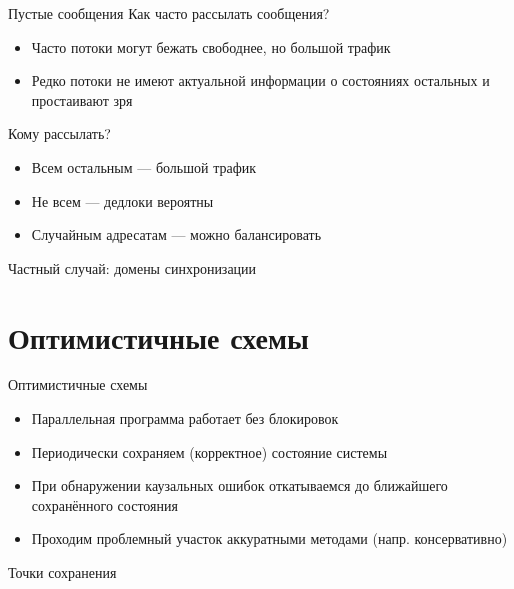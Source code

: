 \documentclass{beamer}
\begin{document}
\begin{frame}{Пустые сообщения}
Как часто рассылать сообщения?

\begin{itemize}
\item Часто \textrightarrow{} потоки могут бежать свободнее, но большой трафик
\item Редко \textrightarrow{} потоки не имеют актуальной информации о состояниях остальных и простаивают зря
\end{itemize}

Кому рассылать?

\begin{itemize}
\item Всем остальным — большой трафик
\item Не всем — дедлоки вероятны
\item Случайным адресатам — можно балансировать
\end{itemize}

\end{frame}

\begin{frame}{Частный случай: домены синхронизации}
    \centering

\end{frame}

\section{Оптимистичные схемы}
\begin{frame}{Оптимистичные схемы}
\begin{itemize}
\item Параллельная программа работает без блокировок
\item Периодически сохраняем (корректное) состояние системы
\item При обнаружении каузальных ошибок откатываемся до ближайшего сохранённого состояния
\item Проходим проблемный участок аккуратными методами (напр. консервативно)
\end{itemize}

\end{frame}

\begin{frame}{Точки сохранения}
\centering
 
\end{frame}
\end{document}
